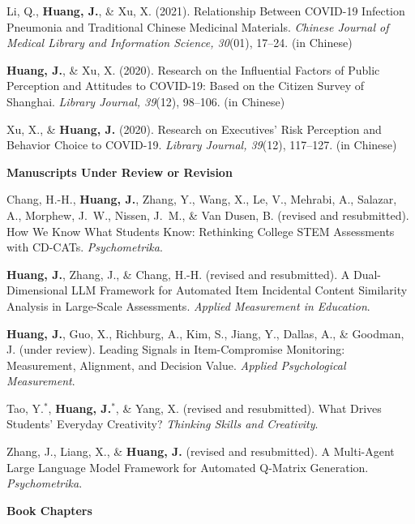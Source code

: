 \documentclass[10.5pt,letterpaper]{article}
\newcommand{\me}[1]{\textbf{#1}}   %
\begin{document}
\begin{pubs}
\item Li, Q., \me{Huang, J.}, \& Xu, X. (2021). Relationship Between COVID-19 Infection Pneumonia and Traditional Chinese Medicinal Materials. \textit{Chinese Journal of Medical Library and Information Science, 30}(01), 17--24. (in Chinese)
\item \me{Huang, J.}, \& Xu, X. (2020). Research on the Influential Factors of Public Perception and Attitudes to COVID-19: Based on the Citizen Survey of Shanghai. \textit{Library Journal, 39}(12), 98--106. (in Chinese)
\item Xu, X., \& \me{Huang, J.} (2020). Research on Executives' Risk Perception and Behavior Choice to COVID-19. \textit{Library Journal, 39}(12), 117--127. (in Chinese)
\end{pubs}
\vspace{4pt}
{\color{textdark}\textbf{Manuscripts Under Review or Revision}}\par\vspace{2pt}
\begin{pubs}
\item Chang, H.-H., \me{Huang, J.}, Zhang, Y., Wang, X., Le, V., Mehrabi, A., Salazar, A., Morphew, J.~W., Nissen, J.~M., \& Van Dusen, B. (revised and resubmitted). How We Know What Students Know: Rethinking College STEM Assessments with CD-CATs. \textit{Psychometrika}.
\item \me{Huang, J.}, Zhang, J., \& Chang, H.-H. (revised and resubmitted). A Dual-Dimensional LLM Framework for Automated Item Incidental Content Similarity Analysis in Large-Scale Assessments. \textit{Applied Measurement in Education}.
\item \me{Huang, J.}, Guo, X., Richburg, A., Kim, S., Jiang, Y., Dallas, A., \& Goodman, J. (under review). Leading Signals in Item-Compromise Monitoring: Measurement, Alignment, and Decision Value. \textit{Applied Psychological Measurement}.
\item Tao, Y.$^{*}$, \me{Huang, J.}$^{*}$, \& Yang, X. (revised and resubmitted). What Drives Students' Everyday Creativity? \textit{Thinking Skills and Creativity}.
\item Zhang, J., Liang, X., \& \me{Huang, J.} (revised and resubmitted). A Multi-Agent Large Language Model Framework for Automated Q-Matrix Generation. \textit{Psychometrika}.
\end{pubs}
\vspace{4pt}
{\color{textdark}\textbf{Book Chapters}}\par\vspace{2pt}
\end{document}
